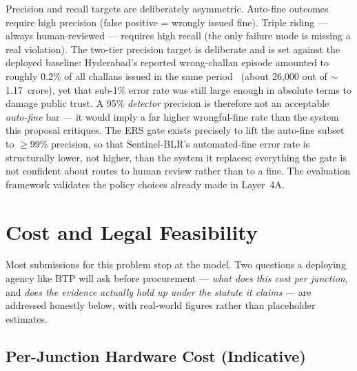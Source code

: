 \documentclass[11pt,a4paper]{article}
\begin{document}
Precision and recall targets are deliberately asymmetric. Auto-fine outcomes require high precision (false positive = wrongly issued fine). Triple riding — always human-reviewed — requires high recall (the only failure mode is missing a real violation). The two-tier precision target is deliberate and is set against the deployed baseline: Hyderabad's reported wrong-challan episode amounted to roughly 0.2\% of all challans issued in the same period~\cite{hyderabadwrongchallan2025} (about 26,000 out of $\sim$1.17~crore), yet that sub-1\% error rate was still large enough in absolute terms to damage public trust. A 95\% \emph{detector} precision is therefore not an acceptable \emph{auto-fine} bar --- it would imply a far higher wrongful-fine rate than the system this proposal critiques. The ERS gate exists precisely to lift the auto-fine subset to $\geq$99\% precision, so that Sentinel-BLR's automated-fine error rate is structurally lower, not higher, than the system it replaces; everything the gate is not confident about routes to human review rather than to a fine. The evaluation framework validates the policy choices already made in Layer~4A.

\section{Cost and Legal Feasibility}
\label{sec:cost-legal}

Most submissions for this problem stop at the model. Two questions a deploying agency like BTP will ask before procurement --- \textit{what does this cost per junction}, and \textit{does the evidence actually hold up under the statute it claims} --- are addressed honestly below, with real-world figures rather than placeholder estimates.
\vspace{-0.2em}
\subsection*{Per-Junction Hardware Cost (Indicative)}
\end{document}
